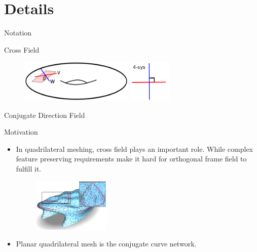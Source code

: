 \documentclass{beamer}
\begin{document}
\section{Details}
\begin{frame}{Notation}
\begin{block}{Cross Field}
\begin{figure}[!htb]
  \includegraphics[height=0.8in]{./img/cross-field.png}
  \includegraphics[height=0.8in]{./img/4-sys.png}
\end{figure}
\end{block}
\begin{block}{Conjugate Direction Field}
\end{block}
\end{frame}

\begin{frame}{Motivation}
\begin{itemize}
\item In quadrilateral meshing, cross field plays an important role. While complex feature preserving requirements make it hard for orthogonal frame field to fulfill it.
\begin{figure}[!htb]
\includegraphics[height=1.0in]{./img/f1.png}
\end{figure}
\item Planar quadrilateral mesh is the conjugate curve network.
\end{itemize}
\end{frame}
\end{document}
